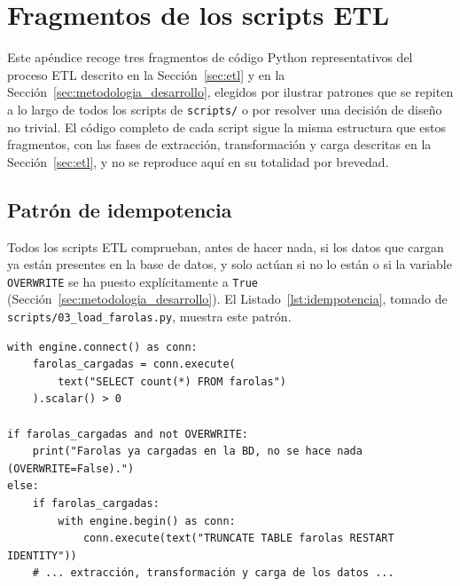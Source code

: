 \chapter{Fragmentos de los scripts ETL}
\label{ap:etl}

Este apéndice recoge tres fragmentos de código Python representativos del proceso ETL descrito en la Sección~\ref{sec:etl} y en la Sección~\ref{sec:metodologia_desarrollo}, elegidos por ilustrar patrones que se repiten a lo largo de todos los scripts de \texttt{scripts/} o por resolver una decisión de diseño no trivial. El código completo de cada script sigue la misma estructura que estos fragmentos, con las fases de extracción, transformación y carga descritas en la Sección~\ref{sec:etl}, y no se reproduce aquí en su totalidad por brevedad.

\section{Patrón de idempotencia}
\label{ap:sec:idempotencia}

Todos los scripts ETL comprueban, antes de hacer nada, si los datos que cargan ya están presentes en la base de datos, y solo actúan si no lo están o si la variable \texttt{OVERWRITE} se ha puesto explícitamente a \texttt{True} (Sección~\ref{sec:metodologia_desarrollo}). El Listado~\ref{lst:idempotencia}, tomado de \texttt{scripts/03\_load\_farolas.py}, muestra este patrón.

\begin{lstlisting}[style=Python, caption={Patrón de idempotencia (\texttt{scripts/03\_load\_farolas.py}).}, label={lst:idempotencia}]
with engine.connect() as conn:
    farolas_cargadas = conn.execute(
        text("SELECT count(*) FROM farolas")
    ).scalar() > 0

if farolas_cargadas and not OVERWRITE:
    print("Farolas ya cargadas en la BD, no se hace nada (OVERWRITE=False).")
else:
    if farolas_cargadas:
        with engine.begin() as conn:
            conn.execute(text("TRUNCATE TABLE farolas RESTART IDENTITY"))
    # ... extracción, transformación y carga de los datos ...
\end{lstlisting}

